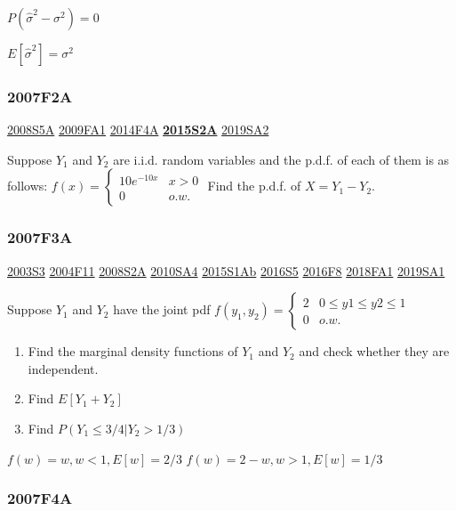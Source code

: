 \documentclass[10pt,twocolumn,portrait]{article}
\begin{document}
\(P(\hat\sigma^2-\sigma^2)=0\)

\(E[\hat\sigma^2]=\sigma^2\)

\hypertarget{f2a}{%
\subsubsection{2007F2A}\label{f2a}}

\protect\hyperlink{s5a}{2008S5A} \protect\hyperlink{fa1}{2009FA1}
\protect\hyperlink{f4a-1}{2014F4A}
\textbf{\protect\hyperlink{s2a-1}{2015S2A}}
\protect\hyperlink{sa2-3}{2019SA2}

Suppose \(Y_1\) and \(Y_2\) are i.i.d. random variables and the p.d.f.
of each of them is as follows:
\(f(x)=\begin{cases}10e^{-10x}& x>0\\0& o.w.\end{cases}\) Find the
p.d.f. of \(X=Y_1-Y_2\).

\hypertarget{f3a}{%
\subsubsection{2007F3A}\label{f3a}}

\protect\hyperlink{s3}{2003S3} \protect\hyperlink{f11}{2004F11}
\protect\hyperlink{s2a}{2008S2A} \protect\hyperlink{sa4-1}{2010SA4}
\protect\hyperlink{s1ab}{2015S1Ab} \protect\hyperlink{s5-4}{2016S5}
\protect\hyperlink{f8-4}{2016F8} \protect\hyperlink{fa1-4}{2018FA1}
\protect\hyperlink{sa1-3}{2019SA1}

Suppose \(Y_1\) and \(Y_2\) have the joint pdf
\(f(y_1,y_2)=\begin{cases}2&0\le y1\le y2\le 1\\0& o.w.\end{cases}\)

\begin{enumerate}
\def\labelenumi{(\alph{enumi})}
\item
  Find the marginal density functions of \(Y_1\) and \(Y_2\) and check
  whether they are independent.
\item
  Find \(E[Y_1+Y_2]\)
\item
  Find \(P(Y_1\le3/4|Y_2>1/3)\)
\end{enumerate}

\(f(w)=w,w<1, E[w]=2/3\) \(f(w)=2-w,w>1, E[w]=1/3\)

\hypertarget{f4a}{%
\subsubsection{2007F4A}\label{f4a}}
\end{document}
